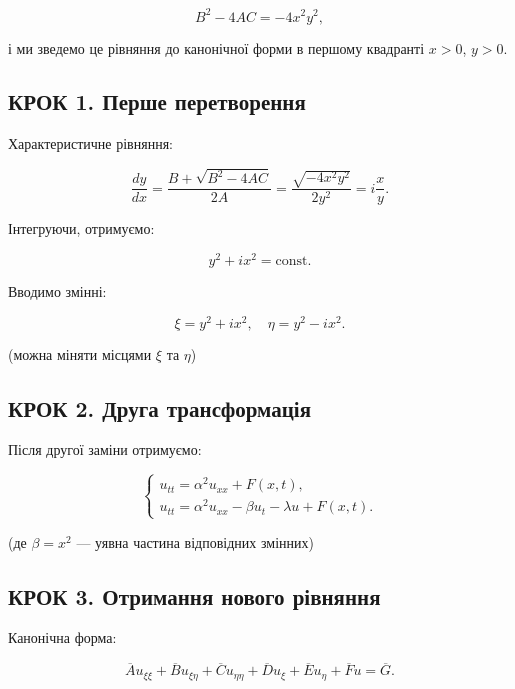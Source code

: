 \documentclass[
  ukrainian,
]{article}
\begin{document}
\[
B^2 - 4AC = -4x^2 y^2,
\]

і ми зведемо це рівняння до канонічної форми в першому квадранті
\(x > 0\), \(y > 0\).

\subsection{КРОК 1. Перше
перетворення}\label{ux43aux440ux43eux43a-1.-ux43fux435ux440ux448ux435-ux43fux435ux440ux435ux442ux432ux43eux440ux435ux43dux43dux44f}

Характеристичне рівняння:

\[
\frac{dy}{dx} = \frac{B + \sqrt{B^2 - 4AC}}{2A} = \frac{\sqrt{-4x^2 y^2}}{2y^2} = i \frac{x}{y}.
\]

Інтегруючи, отримуємо:

\[
y^2 + i x^2 = \text{const}.
\]

Вводимо змінні:

\[
\xi = y^2 + i x^2, \quad \eta = y^2 - i x^2.
\]

(можна міняти місцями \(\xi\) та \(\eta\))

\subsection{КРОК 2. Друга
трансформація}\label{ux43aux440ux43eux43a-2.-ux434ux440ux443ux433ux430-ux442ux440ux430ux43dux441ux444ux43eux440ux43cux430ux446ux456ux44f}

Після другої заміни отримуємо:

\[
\begin{cases}
u_{tt} = \alpha^2 u_{xx} + F(x,t), \\
u_{tt} = \alpha^2 u_{xx} - \beta u_t - \lambda u + F(x,t).
\end{cases}
\]

(де \(\beta = x^2\) --- уявна частина відповідних змінних)

\subsection{КРОК 3. Отримання нового
рівняння}\label{ux43aux440ux43eux43a-3.-ux43eux442ux440ux438ux43cux430ux43dux43dux44f-ux43dux43eux432ux43eux433ux43e-ux440ux456ux432ux43dux44fux43dux43dux44f}

Канонічна форма:

\[
\overline{A}u_{\xi\xi} + \overline{B}u_{\xi\eta} + \overline{C}u_{\eta\eta} + \overline{D}u_{\xi} + \overline{E}u_{\eta} + \overline{F}u = \overline{G}.
\]
\end{document}
